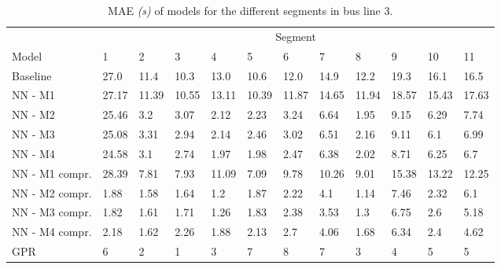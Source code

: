 \begin{table}[H]
  \centering
  \caption{MAE \textit{(s)} of models for the different segments in bus line 3.}
  \label{tbl:model-mae-of-segs-203}
  \begin{adjustbox}{center}
  \begin{tabular}{ l | l | l | l | l | l | l | l | l | l | l | l }
    & \multicolumn{11}{c}{Segment} \\
    Model       & 1 & 2 & 3 & 4 & 5 & 6 & 7 & 8 & 9 & 10 & 11 \\
    \hline
    Baseline  & 27.0 & 11.4 & 10.3 & 13.0 & 10.6 & 12.0 & 14.9 & 12.2 & 19.3 & 16.1  & 16.5 \\
    NN - M1        & 27.17& 11.39& 10.55& 13.11& 10.39& 11.87& 14.65& 11.94& 18.57& 15.43& 17.63\\
    NN - M2         & 25.46& 3.2& 3.07& 2.12& 2.23& 3.24& 6.64& 1.95& 9.15& 6.29& 7.74\\
    NN - M3        & 25.08& 3.31& 2.94& 2.14& 2.46& 3.02& 6.51& 2.16& 9.11& 6.1& 6.99\\
    NN - M4         & 24.58& 3.1& 2.74& 1.97& 1.98& 2.47& 6.38& 2.02& 8.71& 6.25& 6.7\\
    NN - M1 compr.         & 28.39& 7.81& 7.93& 11.09& 7.09& 9.78& 10.26& 9.01& 15.38& 13.22& 12.25 \\ 
    NN - M2 compr.         & 1.88& 1.58& 1.64& 1.2& 1.87& 2.22& 4.1& 1.14& 7.46& 2.32& 6.1 \\
    NN - M3 compr.         & 1.82& 1.61& 1.71& 1.26& 1.83& 2.38& 3.53& 1.3& 6.75& 2.6& 5.18 \\
    NN - M4 compr.         & 2.18& 1.62& 2.26& 1.88& 2.13& 2.7& 4.06& 1.68& 6.34& 2.4& 4.62 \\
    GPR            & 6 & 2 & 1 & 3 &  7 & 8 &  7 & 3 & 4 & 5  & 5 \\
  \end{tabular}
  \end{adjustbox}
\end{table}

